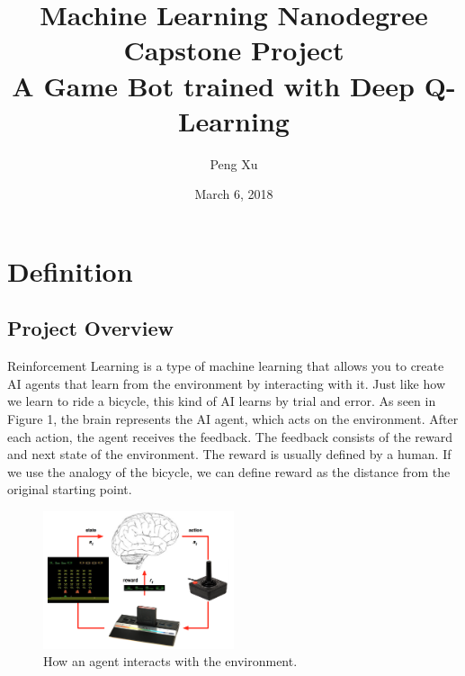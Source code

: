 \documentclass[a4paper]{article}
\begin{document}


\title{Machine Learning Nanodegree \\ Capstone Project \\ A Game Bot trained with Deep Q-Learning }
\author{Peng Xu}
\date{March 6, 2018}
\maketitle


\section{Definition}

\subsection{Project Overview}

Reinforcement Learning is a type of machine learning that allows you to create AI agents that learn from the environment by interacting with it. Just like how we learn to ride a bicycle, this kind of AI learns by trial and error. As seen in Figure 1, the brain represents the AI agent, which acts on the environment. After each action, the agent receives the feedback. The feedback consists of the reward and next state of the environment. The reward is usually defined by a human. If we use the analogy of the bicycle, we can define reward as the distance from the original starting point.

\begin{figure}[h]
\centering
\includegraphics[width=0.5\textwidth]{game-reinforcement-learning.png}
\caption{How an agent interacts with the environment.}
\end{figure}
\end{document}

